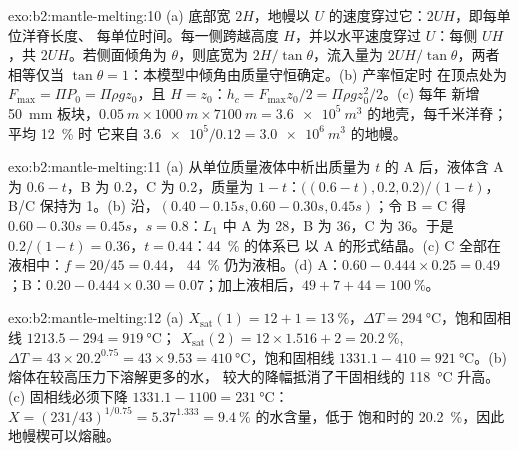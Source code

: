 \begin{solution}{exo:b2:mantle-melting:10}
(a) 底部宽 $2H$，地幔以 $U$ 的速度穿过它：$2UH$，即每单位洋脊长度、
每单位时间。每一侧跨越高度 $H$，并以水平速度穿过
$U$：每侧 $UH$，共 $2UH$。若侧面倾角为 $\theta$，则底宽为
$2H/\tan\theta$，流入量为 $2UH/\tan\theta$，两者相等仅当
$\tan\theta = 1$：本模型中倾角由质量守恒确定。(b) 产率恒定时
在顶点处为 $F_{\max} = \Pi P_0 = \Pi\rho
g z_0$，且 $H = z_0$：$h_c = F_{\max}z_0/2 = \Pi\rho g z_0^2/2$。(c) 每年
新增 \qty{50}{mm} 板块，$\qty{0.05}{m}\times\qty{1000}{m}\times\qty{7100}{m} =
\qty{3.6e5}{m^3}$ 的地壳，每千米洋脊；平均 \qty{12}{\percent} 时
它来自 $\num{3.6e5}/0.12 = \qty{3.0e6}{m^3}$ 的地幔。
\end{solution}

\begin{solution}{exo:b2:mantle-melting:11}
(a) 从单位质量液体中析出质量为 $t$ 的 A 后，液体含 A 为 $0.6 -
t$，B 为 0.2，C 为 0.2，质量为 $1 - t$：$\big((0.6 - t), 0.2,
0.2\big)/(1 - t)$，B/C 保持为 1。(b) 沿，$(0.40 - 0.15s, 0.60 -
0.30s, 0.45s)$；令 B = C 得 $0.60 - 0.30s = 0.45s$，$s = 0.8$：$L_1$ 中 A 为 28，B
为 36，C 为 36。于是 $0.2/(1 - t) = 0.36$，$t = 0.44$：\qty{44}{\percent} 的体系已
以 A 的形式结晶。(c) C 全部在液相中：$f = 20/45 = 0.44$，
\qty{44}{\percent} 仍为液相。(d) A：$0.60 - 0.444\times0.25 = 0.49$；B：$0.20 -
0.444\times0.30 = 0.07$；加上液相后，$49 + 7 + 44 = \qty{100}{\percent}$。
\end{solution}

\begin{solution}{exo:b2:mantle-melting:12}
(a) $X_{\mathrm{sat}}(1) = 12 + 1 = \qty{13}{\percent}$，$\Delta T =
\qty{294}{\celsius}$，饱和固相线 $1213.5 - 294 = \qty{919}{\celsius}$；
$X_{\mathrm{sat}}(2) = 12\times1.516 + 2 = \qty{20.2}{\percent}$, $\Delta T =
43\times20.2^{0.75} = 43\times9.53 = \qty{410}{\celsius}$，饱和固相线 $1331.1
- 410 = \qty{921}{\celsius}$。(b) 熔体在较高压力下溶解更多的水，
较大的降幅抵消了干固相线的 \qty{118}{\celsius} 升高。
(c) 固相线必须下降 $1331.1 - 1100 = \qty{231}{\celsius}$：$X =
(231/43)^{1/0.75} = 5.37^{1.333} = \qty{9.4}{\percent}$ 的水含量，低于
饱和时的 \qty{20.2}{\percent}，因此地幔楔可以熔融。
\end{solution}

